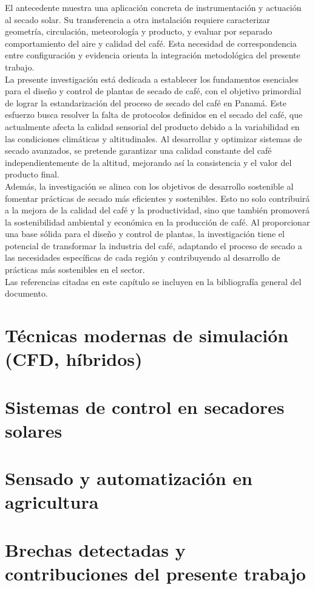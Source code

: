 El antecedente muestra una aplicación concreta de instrumentación y actuación al secado solar. Su transferencia a otra instalación requiere caracterizar geometría, circulación, meteorología y producto, y evaluar por separado comportamiento del aire y calidad del café. Esta necesidad de correspondencia entre configuración y evidencia orienta la integración metodológica del presente trabajo.\\

La presente investigación está dedicada a establecer los fundamentos esenciales para el diseño y control de plantas de secado de café, con el objetivo primordial de lograr la estandarización del proceso de secado del café en Panamá. Este esfuerzo busca resolver la falta de protocolos definidos en el secado del café, que actualmente afecta la calidad sensorial del producto debido a la variabilidad en las condiciones climáticas y altitudinales. Al desarrollar y optimizar sistemas de secado avanzados, se pretende garantizar una calidad constante del café independientemente de la altitud, mejorando así la consistencia y el valor del producto final.\\

Además, la investigación se alinea con los objetivos de desarrollo sostenible al fomentar prácticas de secado más eficientes y sostenibles. Esto no solo contribuirá a la mejora de la calidad del café y la productividad, sino que también promoverá la sostenibilidad ambiental y económica en la producción de café. Al proporcionar una base sólida para el diseño y control de plantas, la investigación tiene el potencial de transformar la industria del café, adaptando el proceso de secado a las necesidades específicas de cada región y contribuyendo al desarrollo de prácticas más sostenibles en el sector.\\

Las referencias citadas en este capítulo se incluyen en la bibliografía general del documento.




\section{Técnicas modernas de simulación (CFD, híbridos)}

\section{Sistemas de control en secadores solares}

\section{Sensado y automatización en agricultura}

\section{Brechas detectadas y contribuciones del presente trabajo}
